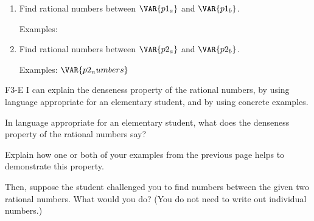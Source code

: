 
\begin{enumerate}
    \item Find  rational numbers between $\VAR{p1_a}$ and $\VAR{p1_b}$. 

    \vfill


    \vfill
    \begin{ansenv}
        Examples:\newline
        \vspace{12pt}
        \noindent
        \noindent
    \end{ansenv}
    \vfill

    \item Find  rational numbers between $\VAR{p2_a}$ and $\VAR{p2_b}$.

    \vfill
    \vfill
    \begin{ansenv}
        Examples:\newline
        \vspace{12pt}
        \noindent
        $\VAR{p2_numbers}$
    \end{ansenv}
    \vfill
    \vfill
    \vfill
\end{enumerate}

\newpage

\begin{setskill}{F3-E}
    I can explain the denseness property of the rational numbers, by using language appropriate for an elementary student, and by using concrete examples.
\end{setskill}

In language appropriate for an elementary student, what does the denseness property of the rational numbers say? 

Explain how one or both of your examples from the previous page helps to demonstrate this property. 

Then, suppose the student challenged you to find  numbers between the given two rational numbers. What would you do? (You do not need to write out  individual numbers.)